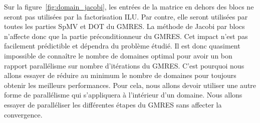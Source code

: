 Sur la figure~\ref{fig:domain_jacobi}, les entrées de la matrice en dehors des blocs ne seront pas utilisées par la factorisation ILU.
%
Par contre, elle seront utilisées par toutes les parties SpMV et DOT du GMRES.
%
La méthode de Jacobi par blocs n'affecte donc que la partie préconditionneur du GMRES.
%
Cet impact n'est pas facilement prédictible et dépendra du problème étudié.
%
Il est donc quasiment impossible de connaître le nombre de domaines optimal pour avoir un bon rapport parallélisme sur nombre d'itérations du GMRES.
%
C'est pourquoi nous allons essayer de réduire au minimum le nombre de domaines pour toujours obtenir les meilleurs performances.
%
Pour cela, nous allons devoir utiliser une autre forme de parallélisme qui s'appliquera à l'intérieur d'un domaine.
%
Nous allons essayer de paralléliser les différentes étapes du GMRES sans affecter la convergence.
